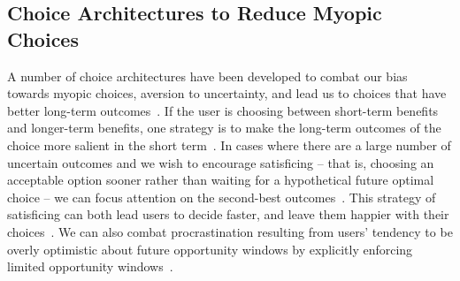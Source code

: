 \subsection{Choice Architectures to Reduce Myopic Choices}

A number of choice architectures have been developed to combat our bias towards myopic choices, aversion to uncertainty, and lead us to choices that have better long-term outcomes~\cite{johnson2012beyond}. If the user is choosing between short-term benefits and longer-term benefits, one strategy is to make the long-term outcomes of the choice more salient in the short term~\cite{weber2007asymmetric, soman2005psychology}. In cases where there are a large number of uncertain outcomes and we wish to encourage satisficing -- that is, choosing an acceptable option sooner rather than waiting for a hypothetical future optimal choice -- we can focus attention on the second-best outcomes~\cite{shu2008future}. This strategy of satisficing can both lead users to decide faster, and leave them happier with their choices~\cite{iyengar2006doing}. We can also combat procrastination resulting from users' tendency to be overly optimistic about future opportunity windows by explicitly enforcing limited opportunity windows~\cite{o1998procrastination}.






